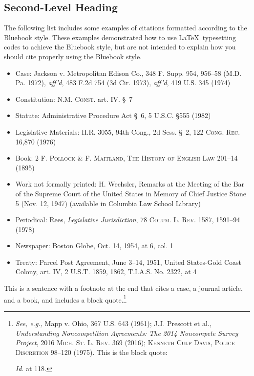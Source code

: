 \documentclass[letterpaper,12pt,twoside]{article}
\begin{document}
\subsection{Second-Level Heading}

\lipsum[3]

The following list includes some examples of citations formatted according to the Bluebook style. These examples demonstrated how to use \LaTeX~typesetting codes to achieve the Bluebook style, but are not intended to explain how you should cite properly using the Bluebook style.

	\begin{itemize}
		\item Case: Jackson v. Metropolitan Edison Co., 348 F. Supp. 954, 956--58 (M.D. Pa. 1972), \emph{aff'd}, 483 F.2d 754 (3d Cir. 1973), \emph{aff'd}, 419 U.S. 345 (1974)
		\item Constitution: \textsc{N.M. Const.} art. IV. \S~7
		\item Statute: Administrative Procedure Act \S~6, 5 U.S.C. \S 555 (1982)
		\item Legislative Materials: H.R. 3055, 94th Cong., 2d Sess. \S~2, 122 \textsc{Cong. Rec.} 16,870 (1976)
		\item Book: 2 \textsc{F. Pollock \& F. Maitland, The History of English Law} 201--14 (1895)
		\item Work not formally printed: H. Wechsler, Remarks at the Meeting of the Bar of the Supreme Court of the United States in Memory of Chief Justice Stone 5 (Nov. 12, 1947) (available in Columbia Law School Library)
		\item Periodical: Rees, \emph{Legislative Jurisdiction}, 78 \textsc{Colum. L. Rev.} 1587, 1591--94 (1978)
		\item	Newspaper: Boston Globe, Oct. 14, 1954, at 6, col. 1
		\item Treaty: Parcel Post Agreement, June 3--14, 1951, United States-Gold Coast Colony, art. IV, 2 U.S.T. 1859, 1862, T.I.A.S. No. 2322, at 4
	\end{itemize}

This is a sentence with a footnote at the end that cites a case, a journal article, and a book, and includes a block quote.\footnote{\emph{See, e.g.,} Mapp v. Ohio, 367 U.S. 643 (1961); J.J. Prescott et al., \emph{Understanding Noncompetition Agreements: The 2014 Noncompete Survey Project}, 2016 \textsc{Mich. St. L. Rev.} 369 (2016); \textsc{Kenneth Culp Davis, Police Discretion 98--120 (1975)}. This is the block quote:
	\begin{quote}
		\lipsum[4]
	\end{quote}
	\emph{Id}. at 118.}
\end{document}
